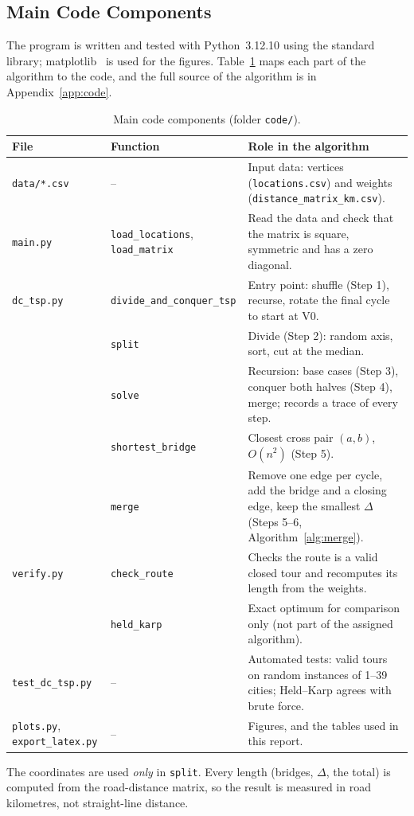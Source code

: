 \subsection{Main Code Components}
The program is written and tested with Python~3.12.10 using the standard library; matplotlib~\cite{hunter2007matplotlib}
is used for the figures. Table~\ref{tab:components} maps each part of the algorithm to the code, and the
full source of the algorithm is in Appendix~\ref{app:code}.

\begin{table}[H]
\centering
\caption{Main code components (folder \texttt{code/}).}\label{tab:components}
\vspace{4pt}
\small
\begin{tabularx}{\textwidth}{l l >{\raggedright\arraybackslash}X}
\toprule
\textbf{File} & \textbf{Function} & \textbf{Role in the algorithm} \\
\midrule
\texttt{data/*.csv} & -- & Input data: vertices (\texttt{locations.csv}) and weights (\texttt{distance\_matrix\_km.csv}). \\
\texttt{main.py} & \texttt{load\_locations}, \texttt{load\_matrix} & Read the data and check that the matrix is square, symmetric and has a zero diagonal. \\
\texttt{dc\_tsp.py} & \texttt{divide\_and\_conquer\_tsp} & Entry point: shuffle (Step 1), recurse, rotate the final cycle to start at V0. \\
 & \texttt{split} & Divide (Step 2): random axis, sort, cut at the median. \\
 & \texttt{solve} & Recursion: base cases (Step 3), conquer both halves (Step 4), merge; records a trace of every step. \\
 & \texttt{shortest\_bridge} & Closest cross pair $(a,b)$, $O(n^2)$ (Step 5). \\
 & \texttt{merge} & Remove one edge per cycle, add the bridge and a closing edge, keep the smallest $\Delta$ (Steps 5--6, Algorithm~\ref{alg:merge}). \\
\texttt{verify.py} & \texttt{check\_route} & Checks the route is a valid closed tour and recomputes its length from the weights. \\
 & \texttt{held\_karp} & Exact optimum for comparison only (not part of the assigned algorithm). \\
\texttt{test\_dc\_tsp.py} & -- & Automated tests: valid tours on random instances of 1--39 cities; Held--Karp agrees with brute force. \\
\texttt{plots.py}, \texttt{export\_latex.py} & -- & Figures, and the tables used in this report. \\
\bottomrule
\end{tabularx}
\end{table}

The coordinates are used \emph{only} in \texttt{split}. Every length (bridges, $\Delta$, the total) is
computed from the road-distance matrix, so the result is measured in road kilometres, not straight-line
distance.
